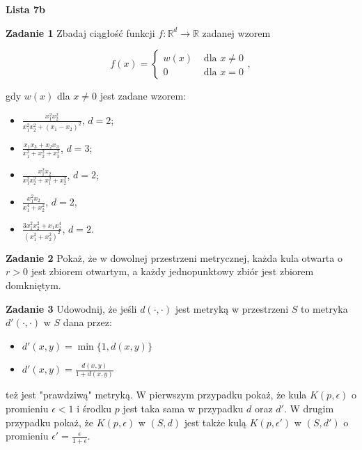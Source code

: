 \documentclass[a4paper,11pt]{article}
\begin{document}
\begin{center}
  {\large\textbf{Lista 7b}}
\end{center}

\textbf{Zadanie 1} Zbadaj ciągłość funkcji $f: \mathbb{R}^d \to
\mathbb{R}$ zadanej wzorem

\[
f(x) = 
\begin{cases}
    w(x) & \text{~dla~} x\neq 0\\
    0 & \text{~dla~} x =0
\end{cases}
,\]

gdy $w(x)$ dla  $x\neq 0$ jest zadane wzorem:

\begin{itemize}
    \item $\frac{x_1^2 x_2^2}{x_1^2 x_2^2 + (x_1-x_2)^2}$, $d=2$;
    \item  $\frac{x_1 x_3 + x_2 x_3}{x_1^2 + x_2^2 + x_3^2}$, $d=3$;
    \item  $\frac{x_1^2 x_2}{x_1^2 x_2^2 + x_1^2 + x_2^2}$, $d=2$;
    \item  $\frac{x_1^2 x_2}{x_1^4 + x_2^2}$, $d=2$,
    \item $\frac{3x_1^2 x_2^2 + x_1 x_2^4}{(x_1^2 + x_2^2)^2}$, $d=2$.
\end{itemize}

\bigskip

\textbf{Zadanie 2} Pokaż, że w dowolnej przestrzeni metrycznej, każda
kula otwarta o $r>0$ jest zbiorem otwartym, a każdy jednopunktowy zbiór
jest zbiorem domkniętym.

\bigskip

\textbf{Zadanie 3} Udowodnij, że jeśli $d(\cdot, \cdot)$ jest metryką w
przestrzeni  $S$ to metryka  $d'(\cdot, \cdot)$ w  $S$ dana przez:

\begin{itemize}
    \item $d'(x,y) = \min\{1, d(x,y)\}$
    \item  $d'(x,y) = \frac{d(x,y)}{1+d(x,y)}$
\end{itemize}

też jest "prawdziwą" metryką. W pierwszym przypadku pokaż, że kula
$K(p,\epsilon)$ o promieniu  $\epsilon < 1$ i środku $p$ jest taka sama w
przypadku $d$ oraz $d'$. W drugim przypadku pokaż, że $K(p,\epsilon)$ w
$(S,d)$ jest także kulą $K(p,\epsilon')$ w $(S,d')$ o promieniu
$\epsilon' = \frac{\epsilon}{1+\epsilon}$.
\end{document}
